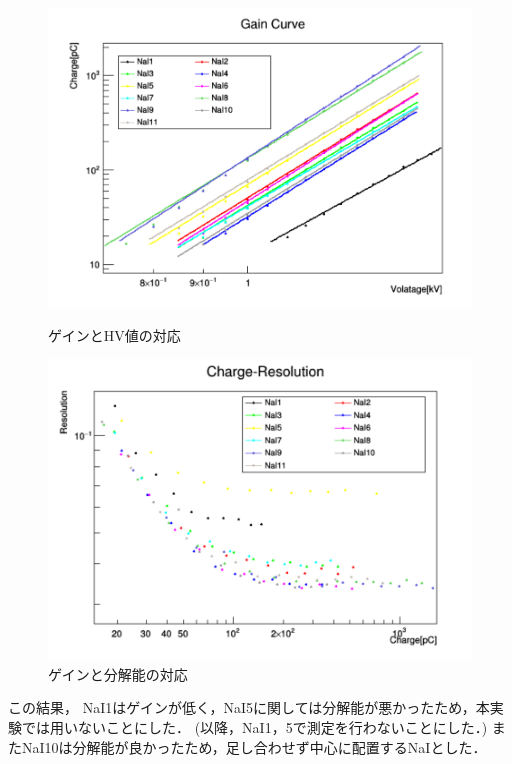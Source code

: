 \begin{figure}[H]
  \begin{minipage}{0.45\hsize}
    \begin{center}\hspace*{-1em}
      \includegraphics[width=1.1\textwidth]{figure/tajima/gain_curve.png}
    \end{center}
    \caption{ゲインとHV値の対応}
    \label{GainHV}
  \end{minipage}
  \hfill
  \begin{minipage}{0.45\hsize}
    \begin{center}
      \includegraphics[width=1.1\textwidth]{figure/tajima/charge_resolution.png}
    \end{center}
    \caption{ゲインと分解能の対応}
    \label{resoHV}
  \end{minipage}
\end{figure}
この結果， NaI1はゲインが低く，NaI5に関しては分解能が悪かったため，本実験では用いないことにした．
(以降，NaI1，5で測定を行わないことにした．)
またNaI10は分解能が良かったため，足し合わせず中心に配置するNaIとした．

